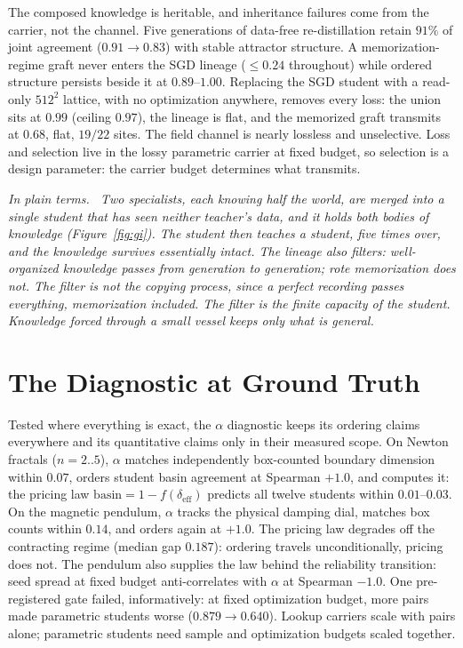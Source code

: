 \documentclass[11pt]{article}
\newenvironment{plainterms}{\par\medskip\noindent\itshape In plain terms.\ }{\par\medskip}
\begin{document}
The composed knowledge is heritable, and inheritance failures come from the carrier, not the channel. Five generations of data-free re-distillation retain $91\%$ of joint agreement ($0.91 \to 0.83$) with stable attractor structure. A memorization-regime graft never enters the SGD lineage ($\leq 0.24$ throughout) while ordered structure persists beside it at $0.89$--$1.00$. Replacing the SGD student with a read-only $512^2$ lattice, with no optimization anywhere, removes every loss: the union sits at $0.99$ (ceiling $0.97$), the lineage is flat, and the memorized graft transmits at $0.68$, flat, $19/22$ sites. The field channel is nearly lossless and unselective. Loss and selection live in the lossy parametric carrier at fixed budget, so selection is a design parameter: the carrier budget determines what transmits.

\begin{plainterms}
Two specialists, each knowing half the world, are merged into a single student that has seen neither teacher's data, and it holds both bodies of knowledge (Figure~\ref{fig:gi}). The student then teaches a student, five times over, and the knowledge survives essentially intact. The lineage also filters: well-organized knowledge passes from generation to generation; rote memorization does not. The filter is not the copying process, since a perfect recording passes everything, memorization included. The filter is the finite capacity of the student. Knowledge forced through a small vessel keeps only what is general.
\end{plainterms}

\section{The Diagnostic at Ground Truth}

Tested where everything is exact, the $\alpha$ diagnostic keeps its ordering claims everywhere and its quantitative claims only in their measured scope. On Newton fractals ($n = 2..5$), $\alpha$ matches independently box-counted boundary dimension within $0.07$, orders student basin agreement at Spearman $+1.0$, and computes it: the pricing law $\mathrm{basin} = 1 - f(\delta_{\mathrm{eff}})$ predicts all twelve students within $0.01$--$0.03$. On the magnetic pendulum, $\alpha$ tracks the physical damping dial, matches box counts within $0.14$, and orders again at $+1.0$. The pricing law degrades off the contracting regime (median gap $0.187$): ordering travels unconditionally, pricing does not. The pendulum also supplies the law behind the reliability transition: seed spread at fixed budget anti-correlates with $\alpha$ at Spearman $-1.0$. One pre-registered gate failed, informatively: at fixed optimization budget, more pairs made parametric students worse ($0.879 \to 0.640$). Lookup carriers scale with pairs alone; parametric students need sample and optimization budgets scaled together.
\end{document}
